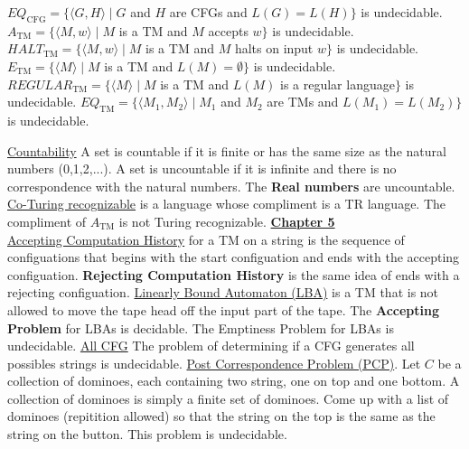 \documentclass[9pt]{article}
\begin{document}
\begin{minipage}[t]{.48\textwidth}
    $EQ_{\text{CFG}}=\{\langle G,H\rangle\mid G$ and $H$ are CFGs and $L(G)=L(H)\}$ is undecidable.\newline
    $A_{\text{TM}}=\{\langle M, w\rangle\mid M$ is a TM and $M$ accepts $w\}$ is undecidable.\newline
    $HALT_{\text{TM}}=\{\langle M,w\rangle\mid M$ is a TM and $M$ halts on input $w\}$ is undecidable.\newline
    $E_{\text{TM}}=\{\langle M\rangle\mid M$ is a TM and $L(M)=\emptyset\}$ is undecidable.\newline
    $REGULAR_{\text{TM}}=\{\langle M\rangle\mid M$ is a TM and $L(M)$ is a regular language$\}$ is undecidable.\newline
    $EQ_{\text{TM}}=\{\langle M_1,M_2\rangle\mid M_1$ and $M_2$ are TMs and $L(M_1) = L(M_2)\}$ is undecidable.
\end{minipage}
\uline{Countability}\newline
A set is countable if it is finite or has the same size as the natural numbers (0,1,2,...). A set is uncountable if it is infinite and there is no correspondence with the natural numbers. The \textbf{Real numbers} are uncountable.\newline
\uline{Co-Turing recognizable} is a language whose compliment is a TR language. The compliment of $A_{\text{TM}}$ is not Turing recognizable.\newline
\uline{\textbf{Chapter 5}}\\
\uline{Accepting Computation History} for a TM on a string is the sequence of configuations that begins with the start configuation and ends with the accepting configuation. \textbf{Rejecting Computation History} is the same idea of ends with a rejecting configuation.\newline
\uline{Linearly Bound Automaton (LBA)} is a TM that is not allowed to move the tape head off the input part of the tape. The \textbf{Accepting Problem} for LBAs is decidable. The Emptiness Problem for LBAs is undecidable.\newline
\uline{All CFG} The problem of determining if a CFG generates all possibles strings is undecidable.\newline
\uline{Post Correspondence Problem (PCP)}. Let $C$ be a collection of dominoes, each containing two string, one on top and one bottom. A collection of dominoes is simply a finite set of dominoes. Come up with a list of dominoes (repitition allowed) so that the string on the top is the same as the string on the button. This problem is undecidable.\newline
\end{document}
